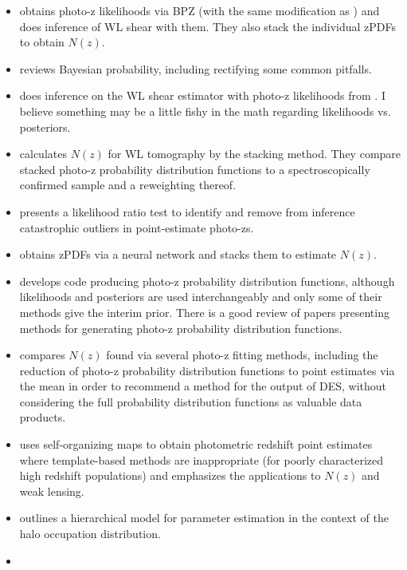 \documentclass[preprint]{aastex}
\begin{document}
\begin{itemize}
\item \citet{Kelly2014} obtains photo-z likelihoods via BPZ (with the same 
modification as \citet{Hildebrandt2012}) and does inference of WL shear with 
them.  They also stack the individual zPDFs to obtain $N(z)$.
\item \citet{Hogg2012} reviews Bayesian probability, including rectifying some 
common pitfalls.
\item \citet{Applegate2014} does inference on the WL shear estimator with 
photo-z likelihoods from \citet{Kelly2014}.  I believe something may be a 
little fishy in the math regarding likelihoods vs. posteriors.
\item \citet{Benjamin2013} calculates $N(z)$ for WL tomography by the stacking 
method.  They compare stacked photo-z probability distribution functions to a 
spectroscopically confirmed sample and a reweighting thereof.
\item \citet{Gorecki2014} presents a likelihood ratio test to identify and 
remove from inference catastrophic outliers in point-estimate photo-zs.
\item \citet{Bonnett2015a} obtains zPDFs via a neural network and stacks them 
to estimate $N(z)$.
\item \citet{Sadeh2015} develops code producing photo-z probability 
distribution functions, although likelihoods and posteriors are used 
interchangeably and only some of their methods give the interim prior.  There 
is a good review of papers presenting methods for generating photo-z 
probability distribution functions.
\item \citet{Bonnett2015} compares $N(z)$ found via several photo-z fitting 
methods, including the reduction of photo-z probability distribution functions 
to point estimates via the mean in order to recommend a method for the output 
of DES, without considering the full probability distribution functions as 
valuable data products.
\item \citet{Masters2015} uses self-organizing maps to obtain photometric 
redshift point estimates where template-based methods are inappropriate (for 
poorly characterized high redshift populations) and emphasizes the applications 
to $N(z)$ and weak lensing.
\item \citet{Marshall2015} outlines a hierarchical model for parameter 
estimation in the context of the halo occupation distribution.
\item \citet{Asorey2016}
\end{itemize}
\end{document}
